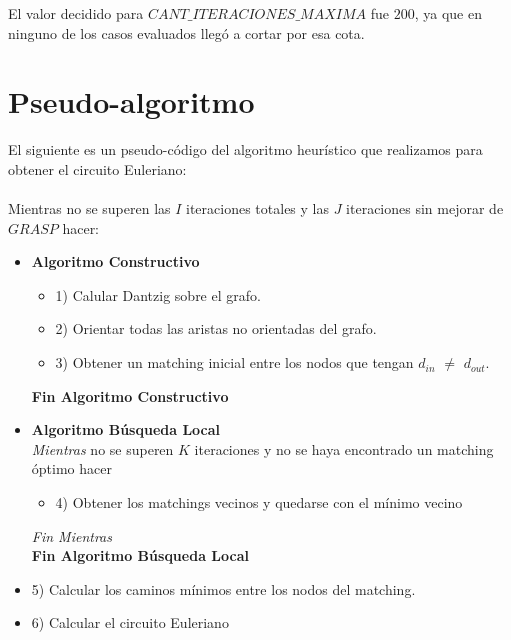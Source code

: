\documentclass[11pt, a4paper, spanish]{article}
\begin{document}
El valor decidido para $CANT\_ITERACIONES\_MAXIMA$ fue $200$, ya que en ninguno de los casos evaluados lleg\'o a cortar por esa cota.\\
\newpage
\section{Pseudo-algoritmo}

El siguiente es un pseudo-c\'odigo del algoritmo heur\'istico que realizamos para obtener el circuito Euleriano:\\

\\
Mientras no se superen las $I$ iteraciones totales y las $J$ iteraciones sin mejorar de $GRASP$ hacer:

\begin{itemize}
	\item \textbf{Algoritmo Constructivo}
		\begin{itemize}
			\item 1) Calular Dantzig sobre el grafo.
			\item 2) Orientar todas las aristas no orientadas del grafo.
			\item 3) Obtener un matching inicial entre los nodos que tengan $d_{in}$ $\neq$ $d_{out}$.
		\end{itemize}
	\textbf{Fin Algoritmo Constructivo}

	\item \textbf{Algoritmo B\'usqueda Local}\\
	\emph{Mientras} no se superen $K$ iteraciones y no se haya encontrado un matching \'optimo hacer
	\begin{itemize}
		\item 4) Obtener los matchings vecinos y quedarse con el m\'inimo vecino
	\end{itemize}
	\emph{Fin Mientras}\\
	\textbf{Fin Algoritmo B\'usqueda Local}

	\item 5) Calcular los caminos m\'inimos entre los nodos del matching.
	\item 6) Calcular el circuito Euleriano\\


\end{itemize}


\newpage
\end{document}
